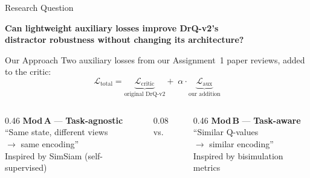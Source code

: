 \documentclass[aspectratio=169]{beamer}
\newcommand{\highlight}[1]{\textcolor{AccentOrange}{\textbf{#1}}}
\begin{document}
\begin{frame}{Research Question}

\begin{center}
\large\color{UofTBlue}
\textbf{Can lightweight auxiliary losses improve DrQ-v2's\\distractor robustness without changing its architecture?}
\end{center}

\vspace{0.3em}

\begin{block}{Our Approach}
\vspace{-0.2em}
Two auxiliary losses from our Assignment~1 paper reviews, added to the critic:
\vspace{-0.5em}
\[
\mathcal{L}_{\text{total}} = \underbrace{\mathcal{L}_{\text{critic}}}_{\text{original DrQ-v2}} + \;\alpha \cdot \underbrace{\mathcal{L}_{\text{aux}}}_{\text{our addition}}
\]
\vspace{-0.8em}
\end{block}

\vspace{0.2em}
\begin{columns}[c]
\begin{column}{0.46\textwidth}
\centering
\highlight{Mod\,A} --- \textbf{Task-agnostic}\\[0.2em]
{\small ``Same state, different views\\$\to$ same encoding''}\\[0.1em]
{\footnotesize Inspired by SimSiam (self-supervised)}
\end{column}
\begin{column}{0.08\textwidth}
\centering vs.
\end{column}
\begin{column}{0.46\textwidth}
\centering
\highlight{Mod\,B} --- \textbf{Task-aware}\\[0.2em]
{\small ``Similar Q-values\\$\to$ similar encoding''}\\[0.1em]
{\footnotesize Inspired by bisimulation metrics}
\end{column}
\end{columns}
\end{frame}

\end{document}
